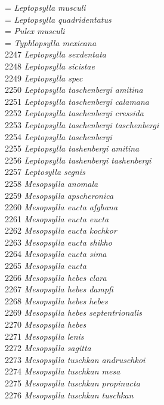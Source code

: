 \documentclass[
]{article}
\begin{document}
= \emph{Leptopsylla musculi}\\
= \emph{Leptopsylla quadridentatus}\\
= \emph{Pulex musculi}\\
= \emph{Typhlopsylla mexicana}\\
2247 \emph{Leptopsylla sexdentata}\\
2248 \emph{Leptopsylla sicistae}\\
2249 \emph{Leptopsylla spec}\\
2250 \emph{Leptopsylla taschenbergi amitina}\\
2251 \emph{Leptopsylla taschenbergi calamana}\\
2252 \emph{Leptopsylla taschenbergi cressida}\\
2253 \emph{Leptopsylla taschenbergi taschenbergi}\\
2254 \emph{Leptopsylla taschenbergi}\\
2255 \emph{Leptopsylla tashenbergi amitina}\\
2256 \emph{Leptopsylla tashenbergi tashenbergi}\\
2257 \emph{Leptosylla segnis}\\
2258 \emph{Mesopsylla anomala}\\
2259 \emph{Mesopsylla apscheronica}\\
2260 \emph{Mesopsylla eucta afghana}\\
2261 \emph{Mesopsylla eucta eucta}\\
2262 \emph{Mesopsylla eucta kochkor}\\
2263 \emph{Mesopsylla eucta shikho}\\
2264 \emph{Mesopsylla eucta sima}\\
2265 \emph{Mesopsylla eucta}\\
2266 \emph{Mesopsylla hebes clara}\\
2267 \emph{Mesopsylla hebes dampfi}\\
2268 \emph{Mesopsylla hebes hebes}\\
2269 \emph{Mesopsylla hebes septentrionalis}\\
2270 \emph{Mesopsylla hebes}\\
2271 \emph{Mesopsylla lenis}\\
2272 \emph{Mesopsylla sagitta}\\
2273 \emph{Mesopsylla tuschkan andruschkoi}\\
2274 \emph{Mesopsylla tuschkan mesa}\\
2275 \emph{Mesopsylla tuschkan propinacta}\\
2276 \emph{Mesopsylla tuschkan tuschkan}\\
\end{document}
